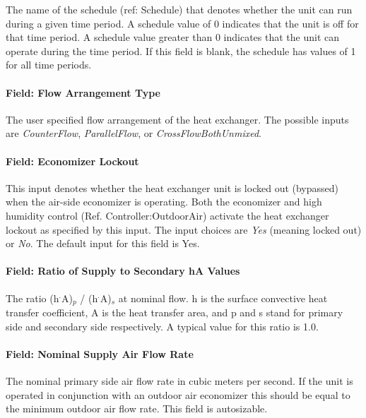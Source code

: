 The name of the schedule (ref: Schedule) that denotes whether the unit can run during a given time period. A schedule value of 0 indicates that the unit is off for that time period. A schedule value greater than 0 indicates that the unit can operate during the time period. If this field is blank, the schedule has values of 1 for all time periods.

\paragraph{Field: Flow Arrangement Type}\label{field-flow-arrangement-type}

The user specified flow arrangement of the heat exchanger. The possible inputs are \emph{CounterFlow}, \emph{ParallelFlow}, or \emph{CrossFlowBothUnmixed}.

\paragraph{Field: Economizer Lockout}\label{field-economizer-lockout}

This input denotes whether the heat exchanger unit is locked out (bypassed) when the air-side economizer is operating. Both the economizer and high humidity control (Ref. Controller:OutdoorAir) activate the heat exchanger lockout as specified by this input. The input choices are \emph{Yes} (meaning locked out) or \emph{No}. The default input for this field is Yes.

\paragraph{Field: Ratio of Supply to Secondary hA Values}\label{field-ratio-of-supply-to-secondary-ha-values}

The ratio (h\(^{.}\)A)\(_{p}\) / (h\(^{.}\)A)\(_{s}\) at nominal flow. h is the surface convective heat transfer coefficient, A is the heat transfer area, and p and s stand for primary side and secondary side respectively. A typical value for this ratio is 1.0.

\paragraph{Field: Nominal Supply Air Flow Rate}\label{field-nominal-supply-air-flow-rate}

The nominal primary side air flow rate in cubic meters per second. If the unit is operated in conjunction with an outdoor air economizer this should be equal to the minimum outdoor air flow rate. This field is autosizable.

